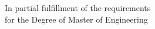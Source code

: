 \begin{titlepage}
\begin{center}
        \vspace*{1.5cm}
        
        In partial fulfillment of the requirements\\
        for the Degree of Master of Engineering\\
        \vspace*{1.5cm}
    \end{center}
\end{titlepage}
